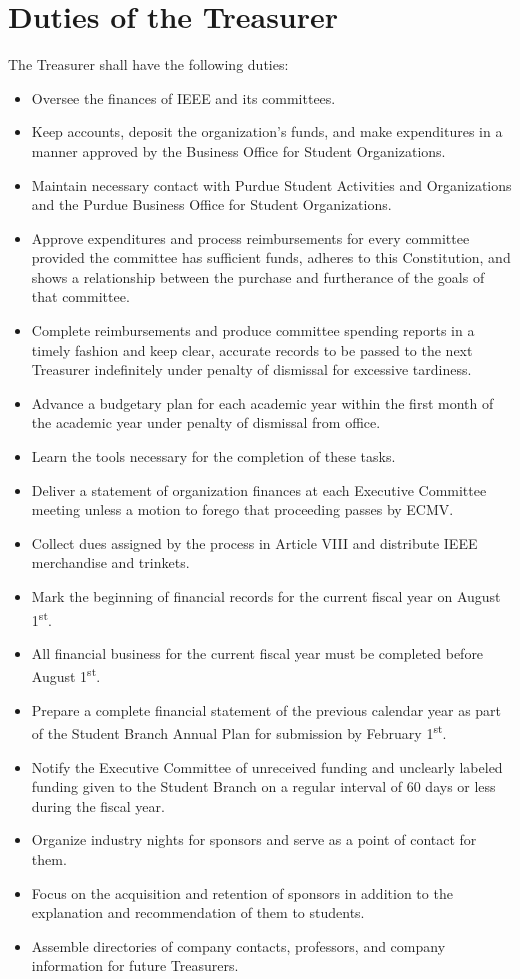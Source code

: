 \documentclass[12pt]{constitution}
\newcommand{\dateannualplansubmit}{February 1\textsuperscript{st}} %
\newcommand{\datefiscalstart}{August 1\textsuperscript{st}} %
\begin{document}
\section{Duties of the Treasurer}
\label{sec:officer_treas}
The Treasurer shall have the following duties:
\begin{itemize}
    \item Oversee the finances of IEEE and its committees.
    \item Keep accounts, deposit the organization's funds, and make expenditures in a manner approved by the Business Office for Student Organizations.
    \item Maintain necessary contact with Purdue Student Activities and Organizations and the Purdue Business Office for Student Organizations.
    \item Approve expenditures and process reimbursements for every committee provided the committee has sufficient funds, adheres to this Constitution, and shows a relationship between the purchase and furtherance of the goals of that committee.
    \item Complete reimbursements and produce committee spending reports in a timely fashion and keep clear, accurate records to be passed to the next Treasurer indefinitely under penalty of dismissal for excessive tardiness.
    \item Advance a budgetary plan for each academic year within the first month of the academic year under penalty of dismissal from office.
    \item Learn the tools necessary for the completion of these tasks.
    \item Deliver a statement of organization finances at each Executive Committee meeting unless a motion to forego that proceeding passes by ECMV.
    \item Collect dues assigned by the process in Article VIII and distribute IEEE merchandise and trinkets.
    \item Mark the beginning of financial records for the current fiscal year on \datefiscalstart{}.
    \item All financial business for the current fiscal year must be completed before \datefiscalstart{}.
    \item Prepare a complete financial statement of the previous calendar year as part of the Student Branch Annual Plan for submission by \dateannualplansubmit{}.
    \item Notify the Executive Committee of unreceived funding and unclearly labeled funding given to the Student Branch on a regular interval of 60 days or less during the fiscal year.
    \item Organize industry nights for sponsors and serve as a point of contact for them.
    \item Focus on the acquisition and retention of sponsors in addition to the explanation and recommendation of them to students.
    \item Assemble directories of company contacts, professors, and company information for future Treasurers.
\end{itemize}
\end{document}
